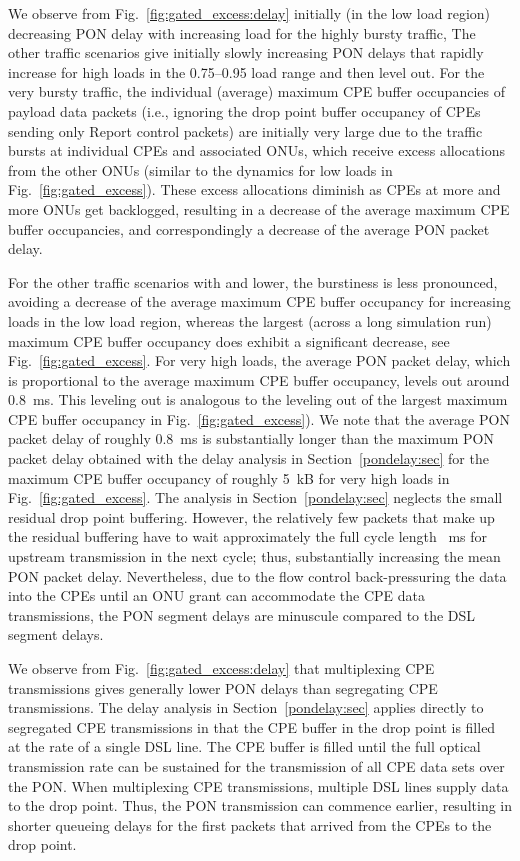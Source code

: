 \documentclass[pdftex,journal]{IEEEtran}
\begin{document}
We observe from Fig.~\ref{fig:gated_excess:delay} initially (in the low load
region)
decreasing PON delay with increasing load
for the highly bursty  traffic,
The other traffic scenarios give initially slowly increasing
PON delays that rapidly increase for high loads in the 0.75--0.95 load range
and then level out.
For the very bursty  traffic, the individual
(average)
maximum CPE buffer occupancies  of payload data packets
(i.e., ignoring the drop point buffer occupancy of CPEs sending only
Report control packets) are initially very large
due to the traffic bursts at individual CPEs and associated ONUs,
which receive excess allocations from the other ONUs
(similar to the dynamics for low loads in Fig.~\ref{fig:gated_excess}).
These excess allocations diminish as CPEs at more and more ONUs get backlogged,
resulting in a decrease of the average maximum CPE buffer occupancies,
and correspondingly a decrease of the average PON packet delay.

For the other traffic scenarios with  and lower,
the burstiness is less pronounced, avoiding a decrease of the average
maximum CPE buffer occupancy for increasing loads in the low load region,
whereas the
largest (across a long simulation run) maximum CPE buffer occupancy
does exhibit a significant decrease, see Fig.~\ref{fig:gated_excess}.
For very high loads, the average PON packet delay,
which is proportional to the average maximum CPE buffer occupancy,
levels out around 0.8~ms.
This leveling out is analogous to the leveling out of the largest
maximum CPE buffer occupancy in Fig.~\ref{fig:gated_excess}).
We note that the average PON packet delay of roughly 0.8~ms
is substantially longer than the maximum PON packet delay
obtained with the delay analysis in Section~\ref{pondelay:sec}
for the maximum CPE buffer occupancy of roughly 5~kB for very high loads in
Fig.~\ref{fig:gated_excess}.
The analysis in Section~\ref{pondelay:sec} neglects the small residual
drop point buffering. However, the relatively few packets that
make up the residual buffering have to wait approximately the full
cycle length ~ms for upstream transmission in the next cycle;
thus, substantially increasing the mean PON packet delay.
Nevertheless, due to the flow control back-pressuring the data into the CPEs
until an ONU grant can accommodate the CPE data transmissions, the PON segment
delays are minuscule compared to the DSL segment delays.

We observe from Fig.~\ref{fig:gated_excess:delay} that
multiplexing CPE transmissions gives generally lower PON delays
than segregating CPE transmissions.
The delay analysis in Section~\ref{pondelay:sec} applies directly
to segregated CPE transmissions in that the CPE buffer
in the drop point is filled
at the rate  of a single DSL line. The CPE buffer is filled
until the full optical transmission rate  can be
sustained for the transmission of all  CPE data sets over the PON.
When multiplexing CPE transmissions, multiple DSL lines supply
data to the drop point. Thus, the PON transmission can commence earlier,
resulting in shorter queueing delays for the first packets that arrived from
the CPEs to the drop point.
\end{document}
